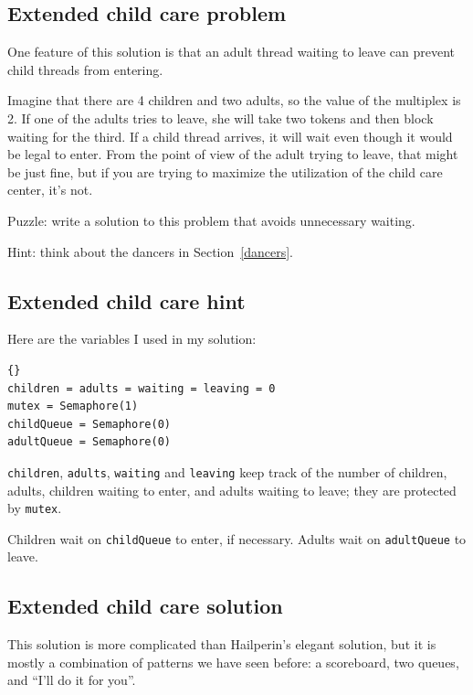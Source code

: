 \documentclass{book}
\newcommand{\clearemptydoublepage}{\newpage\cleardoublepage}
\begin{document}
\subsection {Extended child care problem}

One feature of this solution is that an adult thread waiting to leave
can prevent child threads from entering.

Imagine that there are 4 children and two adults, so the value of the
multiplex is 2.  If one of the adults tries to leave, she will take
two tokens and then block waiting for the third.  If a child thread
arrives, it will wait even though it would be legal to enter.
From the point of view of the adult trying to leave, that might
be just fine, but if you are trying to maximize the utilization
of the child care center, it's not.

Puzzle: write a solution to this problem that avoids unnecessary
waiting.

Hint: think about the dancers in Section~\ref{dancers}.



\clearemptydoublepage
\subsection {Extended child care hint}

Here are the variables I used in my solution:

\begin{lstlisting}[title={Extended child care hint}]{}
children = adults = waiting = leaving = 0
mutex = Semaphore(1)
childQueue = Semaphore(0)
adultQueue = Semaphore(0)
\end{lstlisting}

{\tt children}, {\tt adults}, {\tt waiting} and {\tt leaving}
keep track of the number of children, adults, children waiting
to enter, and adults waiting to leave; they are protected by
{\tt mutex}.

Children wait on {\tt childQueue} to enter, if necessary.
Adults wait on {\tt adultQueue} to leave.



\clearemptydoublepage
\subsection {Extended child care solution}

This solution is more complicated than
Hailperin's elegant solution, but it is mostly a combination
of patterns we have seen before: a scoreboard, two queues,
and ``I'll do it for you''.
\end{document}

